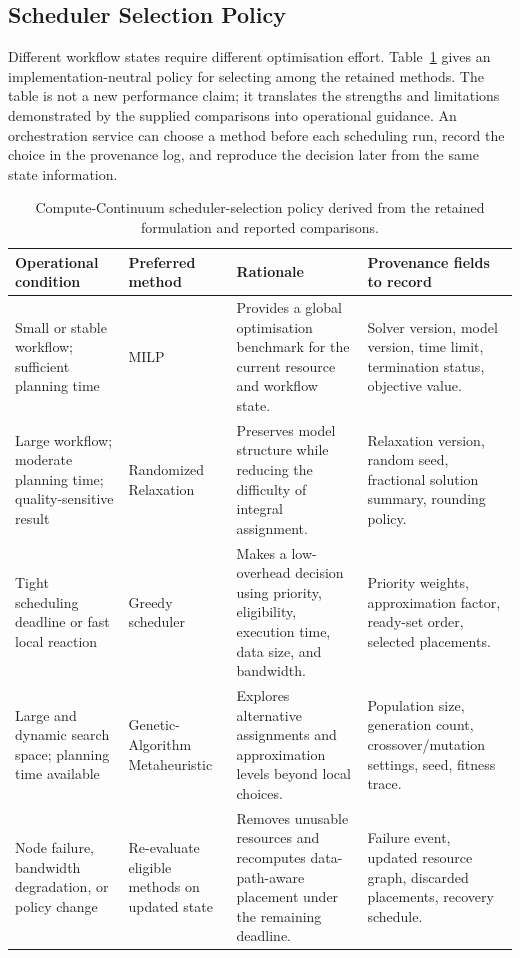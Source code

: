 \subsection{Scheduler Selection Policy}

Different workflow states require different optimisation effort. Table~\ref{tab:orchestration_policy} gives an implementation-neutral policy for selecting among the retained methods. The table is not a new performance claim; it translates the strengths and limitations demonstrated by the supplied comparisons into operational guidance. An orchestration service can choose a method before each scheduling run, record the choice in the provenance log, and reproduce the decision later from the same state information.

\begin{table}[t]
\centering
\caption{Compute-Continuum scheduler-selection policy derived from the retained formulation and reported comparisons.}
\label{tab:orchestration_policy}
\small
\begin{tabular}{|p{}|p{}|p{}|p{}|}
\hline
\textbf{Operational condition} & \textbf{Preferred method} & \textbf{Rationale} & \textbf{Provenance fields to record} \\
\hline
Small or stable workflow; sufficient planning time & MILP & Provides a global optimisation benchmark for the current resource and workflow state. & Solver version, model version, time limit, termination status, objective value. \\
\hline
Large workflow; moderate planning time; quality-sensitive result & Randomized Relaxation & Preserves model structure while reducing the difficulty of integral assignment. & Relaxation version, random seed, fractional solution summary, rounding policy. \\
\hline
Tight scheduling deadline or fast local reaction & Greedy scheduler & Makes a low-overhead decision using priority, eligibility, execution time, data size, and bandwidth. & Priority weights, approximation factor, ready-set order, selected placements. \\
\hline
Large and dynamic search space; planning time available & Genetic-Algorithm Metaheuristic & Explores alternative assignments and approximation levels beyond local choices. & Population size, generation count, crossover/mutation settings, seed, fitness trace. \\
\hline
Node failure, bandwidth degradation, or policy change & Re-evaluate eligible methods on updated state & Removes unusable resources and recomputes data-path-aware placement under the remaining deadline. & Failure event, updated resource graph, discarded placements, recovery schedule. \\
\hline
\end{tabular}
\end{table}

